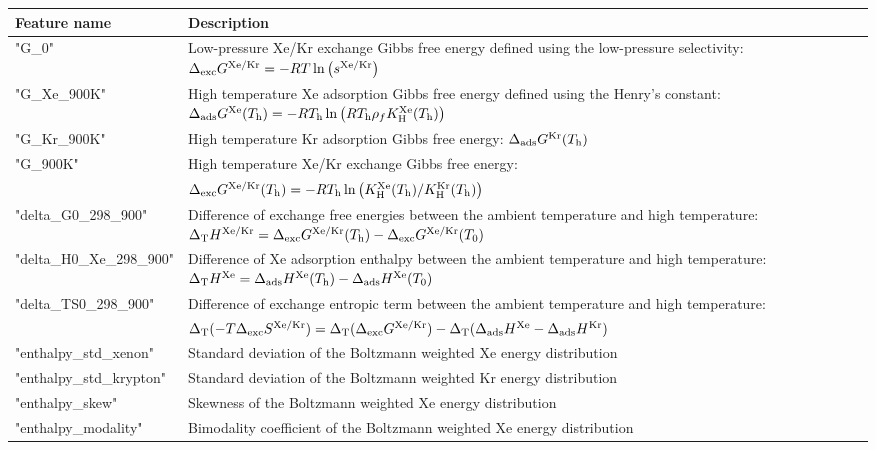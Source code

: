 \documentclass[main]{subfiles}
\begin{document}
\clearpage

  \begin{table}[ht]
  \begin{tabular}{|l|m{13cm}|}
  \hline
   {Feature name} &  {Description} \\
  \hline
  "G\_0"  & Low-pressure Xe/Kr exchange Gibbs free energy defined using the low-pressure selectivity: $\Delta_{\text{exc}} G^{\text{Xe/Kr}} = -RT\ln{\left(s\ensuremath{^{\text{Xe/Kr}}}\right)}$ \\
  \hline
  "G\_Xe\_900K"  & High temperature Xe adsorption Gibbs free energy defined using the Henry's constant: $\Delta_{\text{ads}} G^{\text{Xe}} (T_{\text{h}}) = -RT_{\text{h}}\ln{\left(RT\ensuremath{_{\text{h}}}\rho_fK\ensuremath{_{\text{H}}}\ensuremath{^{\text{Xe}}}(T\ensuremath{_{\text{h}}})\right)}$ \\
  \hline
  "G\_Kr\_900K"  & High temperature Kr adsorption Gibbs free energy: $\Delta_{\text{ads}} G^{\text{Kr}} (T_{\text{h}})$ \\
  \hline
  "G\_900K"  & High temperature Xe/Kr exchange Gibbs free energy: \\
    & $\Delta_{\text{exc}} G^{\text{Xe/Kr}} (T_{\text{h}}) = -RT_{\text{h}}\ln{\left(K\ensuremath{_{\text{H}}}\ensuremath{^{\text{Xe}}}(T\ensuremath{_{\text{h}}})/K\ensuremath{_{\text{H}}}\ensuremath{^{\text{Kr}}}(T\ensuremath{_{\text{h}}})\right)}$ \\
  \hline
  "delta\_G0\_298\_900"  & Difference of exchange free energies between the ambient temperature and high temperature: $\Delta_{\text{T}} H^{\text{Xe/Kr}} = \Delta_{\text{exc}} G^{\text{Xe/Kr}} (T_{\text{h}})-\Delta_{\text{exc}} G^{\text{Xe/Kr}} (T_{\text{0}})$ \\
  \hline
  "delta\_H0\_Xe\_298\_900"  & Difference of Xe adsorption enthalpy between the ambient temperature and high temperature: $\Delta_{\text{T}} H^{\text{Xe}} = \Delta_{\text{ads}} H^{\text{Xe}} (T_{\text{h}})-\Delta_{\text{ads}} H^{\text{Xe}} (T_{\text{0}})$ \\
  \hline
  "delta\_TS0\_298\_900"  & Difference of exchange entropic term between the ambient temperature and high temperature: \\
    & $\Delta_{\text{T}} (-T\Delta_{\text{exc}}S^{\text{Xe/Kr}}) = \Delta_{\text{T}} (\Delta_{\text{exc}}G^{\text{Xe/Kr}}) - \Delta_{\text{T}}( \Delta_{\text{ads}}H^{\text{Xe}} - \Delta_{\text{ads}}H^{\text{Kr}})$ \\
  \hline
  "enthalpy\_std\_xenon"  & Standard deviation of the Boltzmann weighted Xe energy distribution \\
  \hline
  "enthalpy\_std\_krypton"  & Standard deviation of the Boltzmann weighted Kr energy distribution \\
  \hline
  "enthalpy\_skew"  & Skewness of the Boltzmann weighted Xe energy distribution \\
  \hline
  "enthalpy\_modality"  & Bimodality coefficient of the Boltzmann weighted Xe energy distribution \\

\end{tabular}
\end{table}
\end{document}
